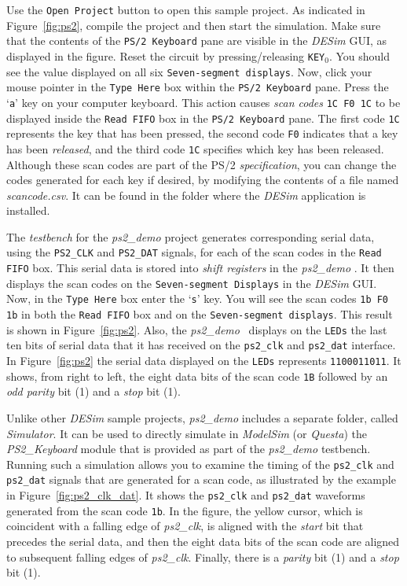{Use the \texttt{Open Project} button to open this sample project. As indicated in 
Figure~\ref{fig:ps2}, compile the project and then start the simulation. Make sure that
the contents of the \texttt{PS/2 Keyboard} pane are visible in the {\it DESim} GUI, as 
displayed in the figure. Reset the circuit by pressing/releasing \texttt{KEY}$_0$.
You should see the value  displayed on all six \texttt{Seven-segment displays}. 
Now, click your mouse pointer in the
\texttt{Type Here} box within the \texttt{PS/2 Keyboard} pane.  Press the `\texttt{a}' key
on your computer keyboard. This action causes {\it scan codes} \texttt{1C F0 1C} to be 
displayed inside the \texttt{Read FIFO} box in the \texttt{PS/2 Keyboard} pane. The first
code \texttt{1C} represents the key that has been pressed, the second code \texttt{F0} indicates
that a key has been {\it released}, and the third code \texttt{1C} specifies which key has
been released. Although these scan codes are part of the PS/2 {\it specification}, you can
change the codes generated for each key if desired, by modifying the contents of a file
named {\it scancode.csv}. It can be found in the folder where the {\it DESim} application
is installed. 

The {\it testbench} for the {\it ps2\_demo} project generates corresponding serial data, using
the \texttt{PS2\_CLK} and \texttt{PS2\_DAT} signals, for each of the scan codes in the 
\texttt{Read FIFO} box. This serial data is stored into {\it shift registers} in the 
{\it ps2\_demo} \hdlModuleName. It then displays the scan codes on the 
\texttt{Seven-segment Displays} in the {\it DESim} GUI. Now, in the \texttt{Type Here} box 
enter the `\texttt{s}' key. You will see the scan codes
\texttt{1b F0 1b} in both the \texttt{Read FIFO} box and on the 
\texttt{Seven-segment displays}. This result is shown in Figure~\ref{fig:ps2}.
Also, the {\it ps2\_demo} \hdlModuleName~displays on the \texttt{LEDs} the last ten bits of 
serial data that it has received on the \texttt{ps2\_clk} and \texttt{ps2\_dat} interface. 
In Figure~\ref{fig:ps2} the serial data displayed on the
\texttt{LEDs} represents \texttt{1100011011}. It shows, from right to left, the eight data
bits of the scan code \texttt{1B} followed by an {\it odd parity} bit (1) and a {\it stop}
bit (1).

Unlike other {\it DESim} sample projects, {\it ps2\_demo} includes a separate folder, 
called {\it Simulator}. It can be used to directly simulate in {\it ModelSim} (or {\it Questa}) 
the {\it PS2\_Keyboard} module that is provided as part of the {\it ps2\_demo} 
testbench. Running such a simulation allows you to examine the timing of the 
\texttt{ps2\_clk} and \texttt{ps2\_dat} signals that are generated for a scan code, as
illustrated by the example in Figure~\ref{fig:ps2_clk_dat}. It shows the \texttt{ps2\_clk} 
and \texttt{ps2\_dat} waveforms generated from the scan code \texttt{1b}. In the figure,
the yellow cursor, which is coincident with a falling edge of {\it ps2\_clk},
is aligned with the {\it start} bit that precedes the serial data, and
then the eight data bits of the scan code are aligned to subsequent falling edges
of {\it ps2\_clk}. Finally, there is a {\it parity} bit (1) and a {\it stop} bit (1). 

}
